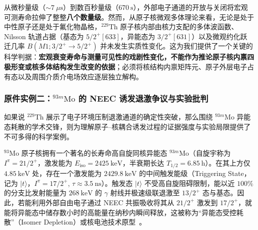 从微秒量级（$\sim 7\ \mu\mathrm{s}$）到数百秒量级（$670\ \mathrm{s}$），外部电子通道的开放与关闭将宏观可测寿命拉伸了整整\textbf{八个数量级}。然而，从原子核微观多体理论来看，无论是处于中性原子还是处于氟化物晶格，$^{229}\mathrm{Th}$ 原子核内部由核力支配的多体波函数、Nilsson 轨道占据（基态为 $5/2^+[633]$，异能态为 $3/2^+[631]$）以及微观约化跃迁几率 $B(M1; 3/2^+ \to 5/2^+)$ 并未发生实质性变化。这为我们提供了一个关键的科学判据：\textbf{宏观衰变寿命与测量可见性的戏剧性变化，不能作为推论原子核内禀四极形变或核多体结构发生改变的依据}；必须将核结构内禀矩阵元、原子外层电子占有态以及周围介质介电场效应逐层独立解构。

\subsubsection{原件实例二：$^{93m}\mathrm{Mo}$ 的 NEEC 诱发退激争议与实验批判}

如果说 $^{229}\mathrm{Th}$ 展示了电子环境压制退激通道的确定性突破，那么围绕 $^{93m}\mathrm{Mo}$ 异能态耗散的学术交锋，则为理解原子--核耦合诱发过程的证据强度与实验局限提供了不可多得的科学案例。

$^{93}\mathrm{Mo}$ 原子核拥有一个著名的长寿命高自旋同核异能态 $^{93m}\mathrm{Mo}$（自旋宇称为 $I^\pi = 21/2^+$，激发能为 $E_{\mathrm{iso}} = 2425\ \mathrm{keV}$，半衰期长达 $T_{1/2} = 6.85\ \mathrm{h}$）。在其上方仅 $4.85\ \mathrm{keV}$ 处，存在一个激发能为 $2429.8\ \mathrm{keV}$ 的中间触发能级（Triggering State，记为 $|t\rangle$，$I^\pi = 17/2^+$, $\tau \approx 3.5\ \mathrm{ns}$）。触发态 $|t\rangle$ 不受高自旋阻碍限制，能以近 $100\%$ 的分支比发射能量为 $268\ \mathrm{keV}$ 的 $\gamma$ 射线并极速级联退激至 $13/2^+$ 态与基态。因此，若能利用外部自由电子通过 NEEC 共振吸收将其从 $21/2^+$ 激发到 $17/2^+$，就能将异能态中储存数小时的高能量在纳秒内瞬间释放，这被称为“异能态受控耗散”（Isomer Depletion）或核电池技术原型~\cite{book-jain-nuclear-isomers}。

